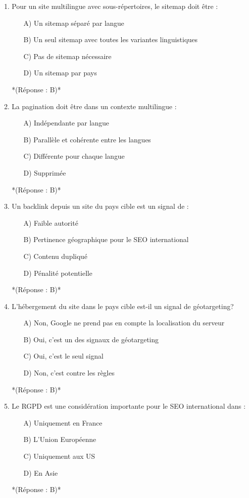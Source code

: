 \documentclass[12pt,a4paper,twoside]{report}
\begin{document}
\begin{enumerate}
\item Pour un site multilingue avec sous-répertoires, le sitemap doit être :
\begin{itemize}
\item[A)] Un sitemap séparé par langue
\item[B)] Un seul sitemap avec toutes les variantes linguistiques
\item[C)] Pas de sitemap nécessaire
\item[D)] Un sitemap par pays
\end{itemize}
*(Réponse : B)*

\item La pagination doit être dans un contexte multilingue :
\begin{itemize}
\item[A)] Indépendante par langue
\item[B)] Parallèle et cohérente entre les langues
\item[C)] Différente pour chaque langue
\item[D)] Supprimée
\end{itemize}
*(Réponse : B)*

\item Un backlink depuis un site du pays cible est un signal de :
\begin{itemize}
\item[A)] Faible autorité
\item[B)] Pertinence géographique pour le SEO international
\item[C)] Contenu dupliqué
\item[D)] Pénalité potentielle
\end{itemize}
*(Réponse : B)*

\item L'hébergement du site dans le pays cible est-il un signal de géotargeting?
\begin{itemize}
\item[A)] Non, Google ne prend pas en compte la localisation du serveur
\item[B)] Oui, c'est un des signaux de géotargeting
\item[C)] Oui, c'est le seul signal
\item[D)] Non, c'est contre les règles
\end{itemize}
*(Réponse : B)*

\item Le RGPD est une considération importante pour le SEO international dans :
\begin{itemize}
\item[A)] Uniquement en France
\item[B)] L'Union Européenne
\item[C)] Uniquement aux US
\item[D)] En Asie
\end{itemize}
*(Réponse : B)*


\end{enumerate}
\end{document}

